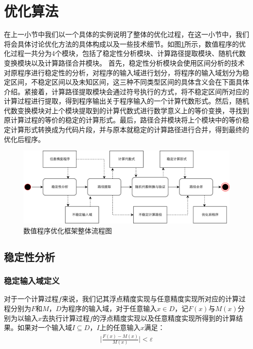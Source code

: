 \section{优化算法}
在上一小节中我们以一个具体的实例说明了整体的优化过程，在这一小节中，我们将会具体讨论优化方法的具体构成以及一些技术细节。如图\ref{fig:mainframe}所示，数值程序的优化过程一共分为4个模块，包括了稳定性分析模块、计算路径提取模块、随机代数变换模块以及计算路径合并模块。
首先，稳定性分析模块会使用区间分析的技术对原程序进行稳定性的分析，对程序的输入域进行划分，将程序的输入域划分为稳定区间，不稳定区间以及未知区间，这三种不同类型区间的具体含义会在下面具体介绍。紧接着，计算路径提取模块会通过符号执行的方式，将不稳定区间所对应的计算过程进行提取，得到程序输出关于程序输入的一个计算代数形式。然后，随机代数变换模块对上个模块提取到的计算代数式进行数学意义上的等价变换，寻找到原计算过程的等价的稳定的计算形式。最后，路径合并模块将上个模块中的等价稳定计算形式转换成为代码片段，并与原本就稳定的计算路径进行合并，得到最终的优化后程序。

\begin{figure}[thbp]
  \centering
 \includegraphics[width=\textwidth]{fig/MainFramework.pdf}
  \caption{数值程序优化框架整体流程图} \label{fig:mainframe}
\end{figure}

\subsection{稳定性分析}

\subsubsection{稳定输入域定义}
对于一个计算过程$f$来说，我们记其浮点精度实现与任意精度实现所对应的计算过程分别为$F$和$M$，$D$为程序的输入域，对于任意输入$x \in D$，记$F(x)$与$M(x)$分别为以输入$x$去执行计算过程$f$的浮点精度实现以及任意精度实现所得到的计算结果。如果对一个输入域$I \subseteq D$，$I$上的任意输入$x$满足：
\begin{align*}
  \Big|\frac{F(x)-M(x)}{M(x)}\Big| < \varepsilon
\end{align*}

